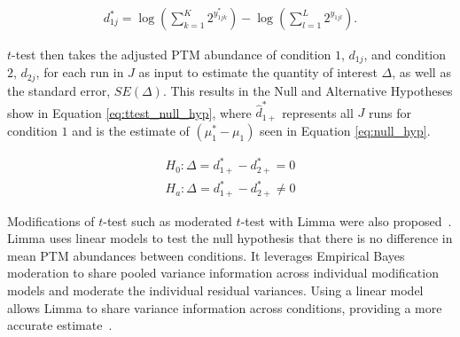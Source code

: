 \documentclass[mcp]{article}
\numberwithin{table}{section}
\begin{document}
\begin{equation}
\begin{aligned}
d_{1j}^{\ast} = \log \left( \sum_{k=1}^{K} 2^{y_{1jk}^{\ast}} \right) - \log \left( \sum_{l=1}^{L} 2^{y_{1jl}} \right).
\end{aligned}
\label{eq:adj_estimation}
\end{equation}


$t$-test then takes the adjusted PTM abundance of condition $1$, $d_{1j}$, and condition $2$, $d_{2j}$, for each run in $J$ as input to estimate the quantity of interest $\Delta$, as well as the standard error, $SE(\Delta)$. This results in the Null and Alternative Hypotheses show in Equation \ref{eq:ttest_null_hyp}, where $\hat{d}_{1+}^{\ast}$ represents all $J$ runs for condition $1$ and is the estimate of $(\mu_{1}^{\ast} - \mu_{1})$ seen in Equation \ref{eq:null_hyp}.

\begin{equation}
\begin{aligned}
H_{0}: \Delta = d_{1+}^{\ast} - d_{2+}^{\ast} = 0 \\
H_{a}: \Delta = d_{1+}^{\ast} - d_{2+}^{\ast} \neq 0
\end{aligned}
\label{eq:ttest_null_hyp}
\end{equation}


\medskip {} Modifications of $t$-test such as moderated $t$-test with Limma were also proposed~\cite{Ritchie_15a}\cite{Zhu}. Limma uses linear models to test the null hypothesis that there is no difference in mean PTM abundances between conditions. It leverages Empirical Bayes moderation to share pooled variance information across individual modification models and moderate the individual residual variances. Using a linear model allows Limma to share variance information across conditions, providing a more accurate estimate~\cite{Ritchie_15a}.
\end{document}
